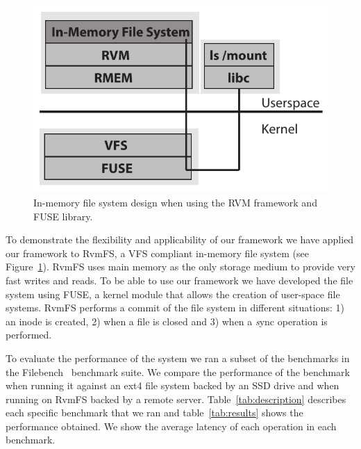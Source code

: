 
\begin{figure}[t]
\begin{center}
\includegraphics[scale=0.60]{graphs/inmem_fs_design.pdf}
\end{center}
\caption{In-memory file system design when using the RVM framework and FUSE library.}
\label{fig:inmem_fs_design}
\end{figure}

To demonstrate the flexibility and applicability of our framework we have
applied our framework to RvmFS, a VFS compliant in-memory file system (see
Figure~\ref{fig:inmem_fs_design}).  RvmFS uses main memory as the only storage
medium to provide very fast writes and reads.  To be able to use our framework
we have developed the file system using FUSE, a kernel module that allows the
creation of user-space file systems.  RvmFS performs a commit of the file
system in different situations: 1) an inode is created, 2) when a file is
closed and 3) when a {\emph sync} operation is performed.

To evaluate the performance of the system we ran a subset of the benchmarks in
the Filebench~\cite{filebench} benchmark suite.  We compare the performance of
the benchmark when running it against an ext4 file system backed by an SSD
drive and when running on RvmFS backed by a remote server.
Table~\ref{tab:description} describes each specific benchmark that we ran and
table~\ref{tab:results} shows the performance obtained.  We show the average
latency of each operation in each benchmark.

